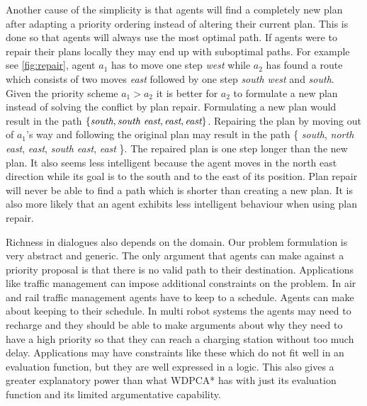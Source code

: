 Another cause of the simplicity is that agents will find a completely new plan
after adapting a priority ordering instead of altering their current plan. This
is done so that agents will always use the most optimal path. If agents were to
repair their plans locally they may end up with suboptimal paths. For example
see \autoref{fig:repair}, agent $a_1$ has to move one step \emph{west} while
$a_2$ has found a route which consists of two moves \emph{east} followed by one
step \emph{south west} and \emph{south}. Given the priority scheme $a_1 > a_2$
it is better for $a_2$ to formulate a new plan instead of solving the conflict
by plan repair. Formulating a new plan would result in the path $\{
\emph{south}, \emph{south east}, \emph{east}, \emph{east} \}$. Repairing the
plan by moving out of $a_1$'s way and following the original plan may result in
the path \{ \emph{south}, \emph{north east}, \emph{east}, \emph{south east},
\emph{east} \}. The repaired plan is one step longer than the new plan. It also
seems less intelligent because the agent moves in the north east direction
while its goal is to the south and to the east of its position. Plan repair
will never be able to find a path which is shorter than creating a new plan. It
is also more likely that an agent exhibits less intelligent behaviour when
using plan repair.

Richness in dialogues also depends on the domain. Our problem formulation is
very abstract and generic. The only argument that agents can make against a
priority proposal is that there is no valid path to their destination.
Applications like traffic management can impose additional constraints on the
problem. In air and rail traffic management agents have to keep to a schedule.
Agents can make about keeping to their schedule. In multi robot systems the
agents may need to recharge and they should be able to make arguments about why
they need to have a high priority so that they can reach a charging station
without too much delay. Applications may have constraints like these which do
not fit well in an evaluation function, but they are well expressed in a logic.
This also gives a greater explanatory power than what WDPCA* has with just its
evaluation function and its limited argumentative capability.


